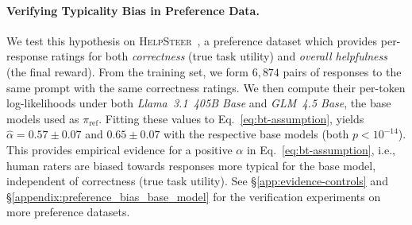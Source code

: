 \paragraph{Verifying Typicality Bias in Preference Data.}  
We test this hypothesis on \textsc{HelpSteer}~\citep{wang2023helpsteer}, a preference dataset which provides per-response ratings for both \emph{correctness} (true task utility) and \emph{overall helpfulness} (the final reward). 
From the training set, we form $6{,}874$ pairs of responses to the same prompt with the same correctness ratings. We then compute their per-token log-likelihoods under both \emph{Llama~3.1~405B Base} and \emph{GLM~4.5 Base}, the base models used as $\pi_{\text{ref}}$. 
Fitting these values to Eq.~\ref{eq:bt-assumption}, yields $\hat{\alpha}=0.57\pm0.07$ and $0.65\pm0.07$ with the respective base models (both $p<10^{-14}$). This provides empirical evidence for a positive $\alpha$ in Eq.~\ref{eq:bt-assumption}, i.e., human raters are biased towards responses more typical for the base model, independent of correctness (true task utility). See \S\ref{app:evidence-controls} and \S\ref{appendix:preference_bias_base_model} for the verification experiments on more preference datasets.


